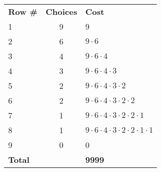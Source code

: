 \begin{center}
\begin{tabular}{l | c | l}
	\textbf{Row \#} & \textbf{Choices} & \textbf{Cost} \\
	1 & 9 & 9 \\
	2 & 6 & $9 \cdot 6$ \\
	3 & 4 & $9 \cdot 6 \cdot 4$ \\
	4 & 3 & $9 \cdot 6 \cdot 4 \cdot 3$ \\
	5 & 2 & $9 \cdot 6 \cdot 4 \cdot 3 \cdot 2$ \\
	6 & 2 & $9 \cdot 6 \cdot 4 \cdot 3 \cdot 2 \cdot 2$ \\
	7 & 1 & $9 \cdot 6 \cdot 4 \cdot 3 \cdot 2 \cdot 2 \cdot 1$ \\
	8 & 1 & $9 \cdot 6 \cdot 4 \cdot 3 \cdot 2 \cdot 2 \cdot 1 \cdot 1$ \\
	9 & 0 & 0 \\
	\hline
	\textbf{Total} & & \textbf{9999}
\end{tabular}
\end{center}
